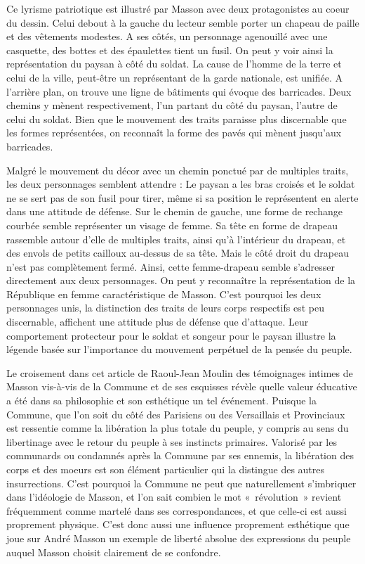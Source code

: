 Ce lyrisme patriotique est illustré par Masson avec deux protagonistes au coeur du dessin. Celui debout à la gauche du lecteur semble porter un chapeau de paille et des vêtements modestes. A ses côtés, un personnage agenouillé avec une casquette, des bottes et des épaulettes tient un fusil. On peut y voir ainsi la représentation du paysan à côté du soldat. La cause de l’homme de la terre et celui de la ville, peut-être un représentant de la garde nationale, est unifiée. A l’arrière plan, on trouve une ligne de bâtiments qui évoque des barricades. Deux chemins y mènent respectivement, l’un partant du côté du paysan, l’autre de celui du soldat. Bien que le mouvement des traits paraisse plus discernable que les formes représentées, on reconnaît la forme des pavés qui mènent jusqu’aux barricades.

 Malgré le mouvement du décor avec un chemin ponctué par de multiples traits, les deux personnages semblent attendre : Le paysan a les bras croisés et le soldat ne se sert pas de son fusil pour tirer, même si sa position le représentent en alerte dans une attitude de défense. Sur le chemin de gauche, une forme de rechange courbée semble représenter un visage de femme. Sa tête en forme de drapeau rassemble autour d’elle de multiples traits, ainsi qu’à l’intérieur du drapeau, et des envols de petits cailloux au-dessus de sa tête. Mais le côté droit du drapeau n’est pas complètement fermé. Ainsi, cette femme-drapeau semble s’adresser directement aux deux personnages. On peut y reconnaître la représentation de la République en femme caractéristique de Masson. C’est pourquoi les deux personnages unis, la distinction des traits de leurs corps respectifs est peu discernable, affichent une attitude plus de défense que d’attaque. Leur comportement protecteur pour le soldat et songeur pour le paysan illustre la légende basée sur l’importance du mouvement perpétuel de la pensée du peuple. 

 Le croisement dans cet article de Raoul-Jean Moulin des témoignages intimes de Masson vis-à-vis de la Commune et de ses esquisses révèle quelle valeur éducative a été dans sa philosophie et son esthétique un tel événement. Puisque la Commune, que l’on soit du côté des Parisiens ou des Versaillais et Provinciaux est ressentie comme la libération la plus totale du peuple, y compris au sens du libertinage avec le retour du peuple à ses instincts primaires. Valorisé par les communards ou condamnés après la Commune par ses ennemis, la libération des corps et des moeurs est son élément particulier qui la distingue des autres insurrections. C’est pourquoi la Commune ne peut que naturellement s’imbriquer dans l’idéologie de Masson, et l’on sait combien le mot « révolution » revient fréquemment comme martelé dans ses correspondances, et que celle-ci est aussi proprement physique. C’est donc aussi une influence proprement esthétique que joue sur André Masson un exemple de liberté absolue des expressions du peuple auquel Masson choisit clairement de se confondre. 

